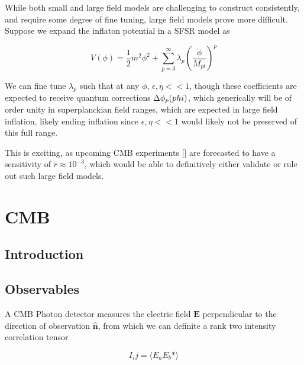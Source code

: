\documentclass[a4paper,11pt]{article}
\renewcommand{\v}[1]{\mathbf{#1}}
\newcommand{\Mp}{M_{pl}}
\newcommand{\half}{\frac{1}{2}}
\begin{document}
While both small and large field models are challenging to construct consistently, and require some degree of fine tuning, large field models prove more difficult. Suppose we expand the inflaton potential in a SFSR model as 

\begin{equation}
V(\phi) = \half m^2\phi^2 + \sum_{p=3}^\infty \lambda_p(\frac{\phi}{\Mp})^p
\end{equation}

We can fine tune $\lambda_p$ such that at any $\phi$, $\epsilon, \eta << 1$, though these coefficients are expected to receive quantum corrections $\Delta\phi_p(\\phi)$, which generically will be of order unity in superplanckian field ranges, which are expected in large field inflation, likely ending inflation since $\epsilon, \eta << 1$ would likely not be preserved of this full range. 

This is exciting, as upcoming CMB experiments [] are forecasted to have a sensitivity of $r\approx 10^{-3}$, which would be able to definitively either validate or rule out such large field models.























\section{CMB}

\subsection{Introduction}

\subsection{Observables}
A CMB Photon detector measures the electric field $\v{E}$ perpendicular to the direction of observation $\hat{\v{n}}$, from which we can definite a rank two intensity correlation tensor

\begin{equation}
I_ij = \langle E_aE_b* \rangle
\end{equation}
\end{document}
